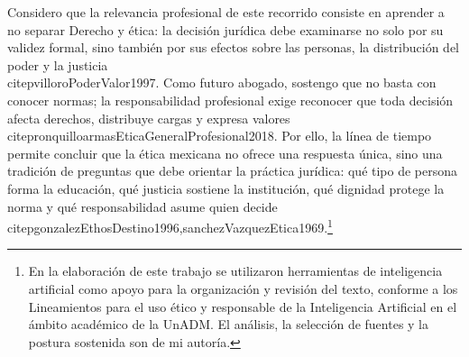 \documentclass[
	spanish,
	letterpaper, oneside
]{article}
\begin{document}
Considero que la relevancia profesional de este recorrido consiste en aprender a no separar Derecho y ética: la decisión jurídica debe examinarse no solo por su validez formal, sino también por sus efectos sobre las personas, la distribución del poder y la justicia \\citep{villoroPoderValor1997}. Como futuro abogado, sostengo que no basta con conocer normas; la responsabilidad profesional exige reconocer que toda decisión afecta derechos, distribuye cargas y expresa valores \\citep{ronquilloarmasEticaGeneralProfesional2018}. Por ello, la línea de tiempo permite concluir que la ética mexicana no ofrece una respuesta única, sino una tradición de preguntas que debe orientar la práctica jurídica: qué tipo de persona forma la educación, qué justicia sostiene la institución, qué dignidad protege la norma y qué responsabilidad asume quien decide \\citep{gonzalezEthosDestino1996,sanchezVazquezEtica1969}.\footnote{En la elaboración de este trabajo se utilizaron herramientas de inteligencia artificial como apoyo para la organización y revisión del texto, conforme a los Lineamientos para el uso ético y responsable de la Inteligencia Artificial en el ámbito académico de la UnADM. El análisis, la selección de fuentes y la postura sostenida son de mi autoría.}


\end{document}
